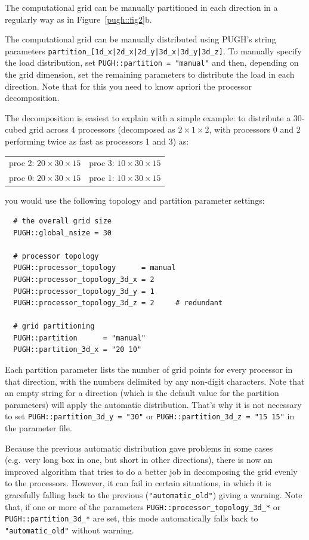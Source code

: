 \documentclass{article}
\begin{document}
The computational grid can be manually partitioned in each direction
in a regularly way as in Figure~\ref{pugh::fig2}b.

The computational grid can be manually distributed using PUGH's
string parameters \verb!partition_[1d_x|2d_x|2d_y|3d_x|3d_y|3d_z]!.
To manually specify the load distribution, set {\tt PUGH::partition = "manual"}
and then, depending on the grid dimension, set the remaining
parameters to distribute the load in each direction. Note that for
this you need to know apriori the processor decomposition.

The decomposition is easiest to explain with a simple example:
to distribute a 30-cubed grid across 4 processors (decomposed as $2 \times 1
\times 2$, with processors 0 and 2 performing twice as fast as processors 1
and 3) as:

\begin{tabular}{cc}
proc 2: $20 \times 30 \times 15$ & proc 3: $10 \times 30 \times 15$ \\
proc 0: $20 \times 30 \times 15$ & proc 1: $10 \times 30 \times 15$ \\
\end{tabular}

you would use the following topology and partition parameter settings:

\begin{verbatim}
  # the overall grid size
  PUGH::global_nsize = 30

  # processor topology
  PUGH::processor_topology      = manual
  PUGH::processor_topology_3d_x = 2
  PUGH::processor_topology_3d_y = 1
  PUGH::processor_topology_3d_z = 2     # redundant

  # grid partitioning
  PUGH::partition      = "manual"
  PUGH::partition_3d_x = "20 10"
\end{verbatim}

Each partition parameter lists the number of grid points for every processor
in that direction, with the numbers delimited by any non-digit characters.
Note that an empty string for a direction (which is the default value for
the partition parameters) will apply the automatic distribution. That's why
it is not necessary to set \verb|PUGH::partition_3d_y = "30"| or
\verb|PUGH::partition_3d_z = "15 15"| in the parameter file.

Because the previous automatic distribution gave problems in some
cases (e.g.\ very long box in one, but short in other directions),
there is now an improved algorithm that tries to do a better job in
decomposing the grid evenly to the processors.  However, it can fail
in certain situations, in which it is gracefully falling back to the
previous (\verb|"automatic_old"|) giving a warning.  Note that, if one
or more of the parameters \verb|PUGH::processor_topology_3d_*| or
\verb|PUGH::partition_3d_*| are set, this mode automatically falls back to
\verb|"automatic_old"| without warning.
\end{document}
